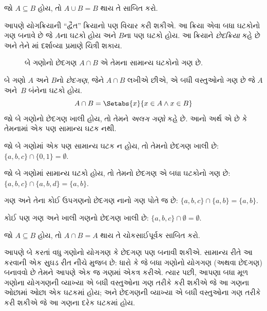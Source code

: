 \begin{prob}
જો $A \subseteq B$ હોય, તો $A \cup B = B$ થાય તે સાબિત કરો.
\end{prob}

\begin{explain}
આપણે યોગક્રિયાની “દ્વૈત” ક્રિયાનો પણ વિચાર કરી શકીએ.
આ ક્રિયા એવા બધા ઘટકોનો ગણ બનાવે છે જે $A$ના ઘટકો
હોય અને $B$ના પણ ઘટકો હોય.
આ ક્રિયાને \emph{છેદક્રિયા} કહે છે અને તેને માં
દર્શાવ્યા પ્રમાણે ચિત્રી શકાય.
\begin{figure}
  \caption{બે ગણોનો છેદગણ $A \cap B$ એ તેમના સામાન્ય ઘટકોનો ગણ છે.}
\end{figure}
\end{explain}

\begin{defn}[છેદગણ]
બે ગણો $A$ અને $B$નો \emph{છેદગણ}, જેને $A \cap B$ લખીએ છીએ,
એ બધી વસ્તુઓનો ગણ છે જે $A$ અને~$B$ બંનેના ઘટકો હોય.
\[
A \cap B = \Setabs{x}{x \in A \land x \in B}
\]
જો બે ગણોનો છેદગણ ખાલી હોય, તો તેમને \emph{અલગ ગણો} કહે છે.
આનો અર્થ એ છે કે તેમનામાં એક પણ સામાન્ય ઘટક નથી.
\end{defn}

\begin{ex}
જો બે ગણોમાં એક પણ સામાન્ય ઘટક ન હોય, તો તેમનો છેદગણ ખાલી છે:
$\{ a, b, c\} \cap \{ 0, 1\} = \emptyset$.

જો બે ગણોમાં સામાન્ય ઘટકો હોય, તો તેમનો છેદગણ એ બધા
ઘટકોનો ગણ છે: $\{a, b, c \} \cap \{a, b, d \} = \{a, b\}$.

ગણ અને તેના કોઈ ઉપગણનો છેદગણ નાનો ગણ પોતે જ છે:
$\{a, b, c\} \cap \{a, b\} = \{a, b\}$.

કોઈ પણ ગણ અને ખાલી ગણનો છેદગણ ખાલી છે:
$\{a, b, c \} \cap \emptyset = \emptyset$.
\end{ex}

\begin{prob}
જો $A \subseteq B$ હોય, તો $A \cap B = A$ થાય તે ચોકસાઈપૂર્વક સાબિત કરો.
\end{prob}

\begin{explain}
આપણે બે કરતાં વધુ ગણોનો યોગગણ કે છેદગણ પણ બનાવી શકીએ.
સામાન્ય રીતે આ કરવાની એક સુઘડ રીત નીચે મુજબ છે:
ધારો કે જે બધા ગણોનો યોગગણ (અથવા છેદગણ) બનાવવો છે તેમને
આપણે એક જ ગણમાં એકત્ર કરીએ. ત્યાર પછી, આપણા બધા મૂળ ગણોના
યોગગણની વ્યાખ્યા એ બધી વસ્તુઓના ગણ તરીકે કરી શકીએ જે આ ગણના
ઓછામાં ઓછા એક ઘટકમાં હોય; અને છેદગણની વ્યાખ્યા એ બધી
વસ્તુઓના ગણ તરીકે કરી શકીએ જે આ ગણના દરેક ઘટકમાં હોય.
\end{explain}

